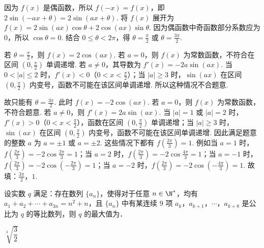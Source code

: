 \documentclass[UTF8,a4paper,oneside,11pt]{ctexbook}
\begin{document}
\begin{solution}
因为 \(f(x)\) 是偶函数，所以 \(f(-x)=f(x)\)，即 \(2\sin\left( -ax+\theta \right)=2\sin\left( ax+\theta \right)\). 将 \(f(x)\) 展开为 \(f(x)=2\sin\left( ax \right)\cos\theta+2\cos\left( ax \right)\sin\theta\). 因为偶函数中奇函数部分系数应为 \(0\)，所以 \(\cos\theta=0\). 结合 \(0\le \theta<2\pi\)，得 \(\theta=\frac{\pi}{2}\) 或 \(\theta=\frac{3\pi}{2}\).

若 \(\theta=\frac{\pi}{2}\)，则 \(f(x)=2\cos\left( ax \right)\). 若 \(a=0\)，则 \(f(x)\) 为常数函数，不符合在区间 \(\left( 0,\frac{\pi}{2} \right)\) 单调递增. 若 \(a\ne 0\)，其导数为 \(f'(x)=-2a\sin\left( ax \right)\).
当 \(0<|a|\le 2\) 时，\(f'(x)<0\)（\(0<x<\frac{\pi}{2}\)）；当 \(|a|\ge 3\) 时，\(\sin\left( ax \right)\) 在区间 \(\left( 0,\frac{\pi}{2} \right)\) 内变号，函数不可能在该区间单调递增. 所以这种情况不合题意.

故只能有 \(\theta=\frac{3\pi}{2}\). 此时 \(f(x)=-2\cos\left( ax \right)\). 若 \(a=0\)，则 \(f(x)\) 为常数函数，不符合题意. 若 \(a\ne 0\)，则 \(f'(x)=2a\sin\left( ax \right)\).
当 \(|a|=1\) 或 \(|a|=2\) 时，\(f'(x)>0\)（\(0<x<\frac{\pi}{2}\)），函数在区间 \(\left( 0,\frac{\pi}{2} \right)\) 单调递增；当 \(|a|\ge 3\) 时，\(\sin\left( ax \right)\) 在区间 \(\left( 0,\frac{\pi}{2} \right)\) 内变号，函数不可能在该区间单调递增.
因此满足题意的整数 \(a\) 为 \(a=\pm1\) 或 \(a=\pm2\). 这些情况下都有 \(f\left( \frac{2\pi}{3} \right)=1\). 例如当 \(a=1\) 时，\(f\left( \frac{2\pi}{3} \right)=-2\cos \frac{2\pi}{3}=1\)；当 \(a=2\) 时，\(f\left( \frac{2\pi}{3} \right)=-2\cos \frac{4\pi}{3}=1\)；当 \(a=-1\) 时，\(f\left( \frac{2\pi}{3} \right)=-2\cos \left( -\frac{2\pi}{3} \right)=1\)；当 \(a=-2\) 时，\(f\left( \frac{2\pi}{3} \right)=-2\cos \left( -\frac{4\pi}{3} \right)=1\).
故填：\(\frac{3\pi}{2}\)，\(1\).
\end{solution}

\begin{problem}
设实数 \(q\) 满足：存在数列 \(\{a_n\}\)，使得对于任意 \(n\in\N^*\)，均有 \(a_1+a_2+\cdots+a_{3n}=n^2+n\)，且 \(\{a_n\}\) 中有某连续 \(9\) 项 \(a_k\)，\(a_{k+1}\)，\(\cdots\)，\(a_{k+8}\) 是公比为 \(q\) 的等比数列，则 \(q\) 的最大值为\fillinblank{}．
\end{problem}

\begin{answer}
\(\sqrt[3]{\dfrac{3}{2}}\)
\end{answer}
\end{document}
